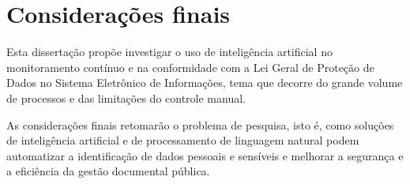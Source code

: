 
\section{Considerações finais}

Esta dissertação propõe investigar o uso de inteligência artificial no
monitoramento contínuo e na conformidade com a Lei Geral de Proteção de Dados no
Sistema Eletrônico de Informações, tema que decorre do grande volume de
processos e das limitações do controle manual.

As considerações finais retomarão o problema de pesquisa, isto é, como soluções
de inteligência artificial e de processamento de linguagem natural podem
automatizar a identificação de dados pessoais e sensíveis e melhorar a segurança
e a eficiência da gestão documental pública.
